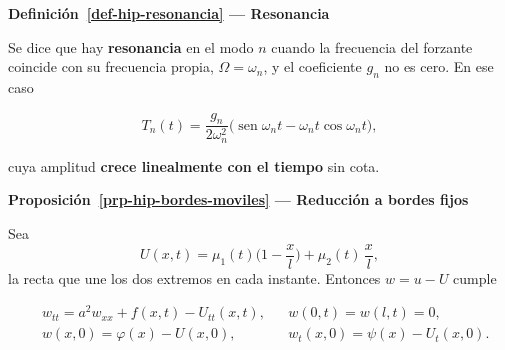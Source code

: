 \documentclass[
  spanish,
  a4paper,
]{scrbook}
\theoremstyle{definition}
\theoremstyle{plain}
\theoremstyle{definition}
\theoremstyle{plain}
\theoremstyle{definition}
\theoremstyle{remark}
\begin{document}
\begin{tcolorbox}[enhanced jigsaw, arc=.35mm, bottomrule=.15mm, breakable, colback=white, colframe=quarto-callout-note-color-frame, left=2mm, leftrule=.75mm, opacityback=0, rightrule=.15mm, toprule=.15mm]
\begin{minipage}[t]{5.5mm}
\textcolor{quarto-callout-note-color}{\faInfo}
\end{minipage}%
\begin{minipage}[t]{\textwidth - 5.5mm}

\vspace{-3mm}\textbf{Definición~\ref{def-hip-resonancia} --- Resonancia}\vspace{3mm}

Se dice que hay \textbf{resonancia} en el modo \(n\) cuando la
frecuencia del forzante coincide con su frecuencia propia,
\(\Omega = \omega_n\), y el coeficiente \(g_n\) no es cero. En ese caso

\[
T_n(t) = \frac{g_n}{2\omega_n^2}\big(\operatorname{sen}\omega_nt - \omega_nt\cos\omega_nt\big),
\]

cuya amplitud \textbf{crece linealmente con el tiempo} sin cota.

\end{minipage}%
\end{tcolorbox}

\begin{tcolorbox}[enhanced jigsaw, arc=.35mm, bottomrule=.15mm, breakable, colback=white, colframe=quarto-callout-note-color-frame, left=2mm, leftrule=.75mm, opacityback=0, rightrule=.15mm, toprule=.15mm]
\begin{minipage}[t]{5.5mm}
\textcolor{quarto-callout-note-color}{\faInfo}
\end{minipage}%
\begin{minipage}[t]{\textwidth - 5.5mm}

\vspace{-3mm}\textbf{Proposición~\ref{prp-hip-bordes-moviles} --- Reducción a bordes fijos}\vspace{3mm}

Sea \[
U(x,t) = \mu_1(t)\Big(1 - \frac{x}{l}\Big) + \mu_2(t)\,\frac{x}{l},
\] la recta que une los dos extremos en cada instante. Entonces
\(w = u - U\) cumple

\[
\begin{aligned}
&w_{tt} = a^2w_{xx} + f(x,t) - U_{tt}(x,t), && w(0,t) = w(l,t) = 0,\\
&w(x,0) = \varphi(x) - U(x,0), && w_t(x,0) = \psi(x) - U_t(x,0).
\end{aligned}
\]

\end{minipage}%
\end{tcolorbox}
\end{document}
